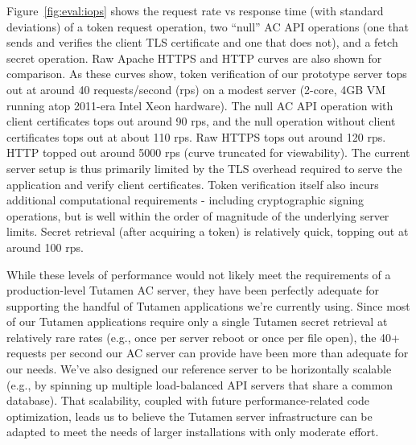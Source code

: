 Figure~\ref{fig:eval:iops} shows the request rate vs response time
(with standard deviations) of a token request operation, two ``null''
AC API operations (one that sends and verifies the client TLS
certificate and one that does not), and a fetch secret operation. Raw
Apache HTTPS and HTTP curves are also shown for comparison. As these
curves show, token verification of our prototype server tops out at
around 40 requests/second (rps) on a modest server (2-core, 4GB VM
running atop 2011-era Intel Xeon hardware). The null AC API operation
with client certificates tops out around 90 rps, and the null
operation without client certificates tops out at about 110 rps. Raw
HTTPS tops out around 120 rps. HTTP topped out around 5000 rps (curve
truncated for viewability). The current server setup is thus primarily
limited by the TLS overhead required to serve the application and
verify client certificates. Token verification itself also incurs
additional computational requirements - including cryptographic
signing operations, but is well within the order of magnitude of the
underlying server limits. Secret retrieval (after acquiring a token)
is relatively quick, topping out at around 100 rps.

While these levels of performance would not likely meet the
requirements of a production-level Tutamen AC server, they have been
perfectly adequate for supporting the handful of Tutamen applications
we're currently using. Since most of our Tutamen applications require
only a single Tutamen secret retrieval at relatively rare rates (e.g.,
once per server reboot or once per file open), the 40+ requests per
second our AC server can provide have been more than adequate for our
needs. We've also designed our reference server to be horizontally
scalable (e.g., by spinning up multiple load-balanced API servers that
share a common database). That scalability, coupled with future
performance-related code optimization, leads us to believe the Tutamen
server infrastructure can be adapted to meet the needs of larger
installations with only moderate effort.

